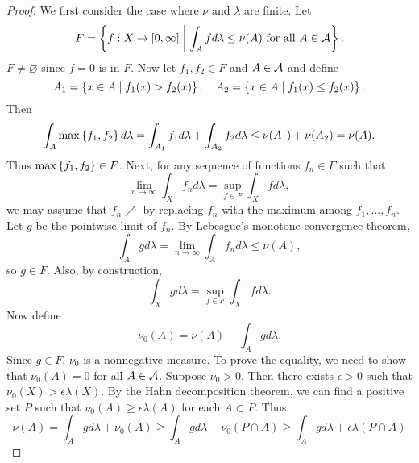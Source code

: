 \begin{proof}
    We first consider the case where $\nu$ and $\lambda$ are finite.
    Let 
    \begin{equation*}
        F = \left\{ f:X\to[0,\infty] \;\middle\vert\; \int_A fd\lambda \leq \nu(A) \text{ for all } A\in\mathcal{A} \right\}.
    \end{equation*}
    $F\neq\varnothing$ since $f = 0$ is in $F$. Now let $f_1,f_2\in F$ 
    and $A\in\mathcal{A}$ and define 
    \begin{equation*}
        A_1 = \left\{ x\in A \;\middle\vert\; f_1(x) > f_2(x) \right\}, \quad 
        A_2 = \left\{ x\in A \;\middle\vert\; f_1(x) \leq f_2(x) \right\}.
    \end{equation*} 
    Then 
    \begin{equation*}
        \int_A \max\left\{ {f_1,f_2} \right\}d\lambda = \int_{A_1} f_1d\lambda + \int_{A_2} f_2d\lambda 
        \leq \nu(A_1) + \nu(A_2) = \nu(A).
    \end{equation*}
    Thus $\max\left\{ {f_1,f_2} \right\}\in F$. Next, for any sequence of 
    functions $f_n\in F$ such that 
    \begin{equation*}
        \lim_{n\to\infty}\int_X f_nd\lambda = \sup_{f\in F}\int_X fd\lambda,
    \end{equation*}
    we may assume that $f_n\nearrow$ by replacing $f_n$ with 
    the maximum among $f_1,\ldots,f_n$. Let $g$ be the pointwise 
    limit of $f_n$. By Lebesgue's monotone convergence theorem, 
    \begin{equation*}
        \int_A gd\lambda = \lim_{n\to\infty}\int_A f_nd\lambda \leq \nu(A),
    \end{equation*}
    so $g\in F$. Also, by construction, 
    \begin{equation*}
        \int_X gd\lambda = \sup_{f\in F}\int_X fd\lambda.
    \end{equation*}
    Now define 
    \begin{equation*}
        \nu_0(A) = \nu(A) - \int_A gd\lambda.
    \end{equation*}
    Since $g\in F$, $\nu_0$ is a nonnegative measure. To prove 
    the equality, we need to show that $\nu_0(A) = 0$ for all 
    $A\in\mathcal{A}$. Suppose $\nu_0 > 0$. Then there exists $\epsilon>0$ 
    such that $\nu_0(X)>\epsilon\lambda(X)$. By the Hahn decomposition 
    theorem, we can find a positive set $P$ such that 
    $\nu_0(A)\geq\epsilon\lambda(A)$ for each $A\subset P$. Thus 
    \begin{equation*}
        \nu(A) = \int_A gd\lambda + \nu_0(A) 
        \geq \int_A gd\lambda + \nu_0(P\cap A) 
        \geq \int_A gd\lambda + \epsilon\lambda(P\cap A) 

\end{equation*}
\end{proof}
